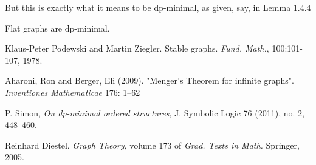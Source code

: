 \documentclass{amsart}
\begin{document}
But this is exactly what it means to be dp-minimal, as given, say, in \cite{simon_dp_minimal} Lemma 1.4.4

\begin{Corollary}
	Flat graphs are dp-minimal.
\end{Corollary}


\begin{thebibliography}{9}

	Klaus-Peter Podewski and Martin Ziegler. Stable graphs. \textit{Fund. Math.}, 100:101-107, 1978.

	Aharoni, Ron and Berger, Eli (2009). "Menger's Theorem for infinite graphs". \textit{Inventiones Mathematicae} 176: 1–62
	
	P. Simon, \textit{On dp-minimal ordered structures}, J. Symbolic Logic 76 (2011), no. 2, 448–460.

	Reinhard Diestel. \textit{Graph Theory}, volume 173 of \textit{Grad. Texts in Math.} Springer, 2005.

\end{thebibliography}
\end{document}
